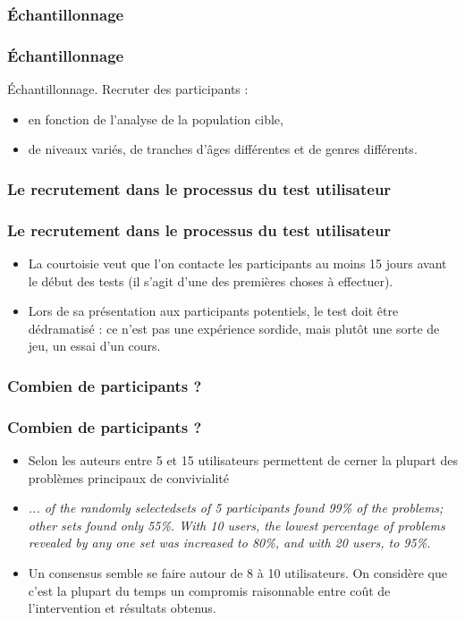 			\subsubsection{Échantillonnage} 
			
			\begin{frame}[allowframebreaks]
			\frametitle{Échantillonnage}
			Échantillonnage. Recruter des participants :
					\begin {itemize}
					\item en fonction de l’analyse de la population cible, 
					\item de niveaux variés, de tranches d’âges différentes et de genres différents.
					\end{itemize}
			\end{frame} 	
			
			\subsubsection{Le recrutement dans le processus du test utilisateur} 
			
			\begin{frame}[allowframebreaks]
			\frametitle{Le recrutement dans le processus du test utilisateur}
			\begin {itemize}
					\item La courtoisie veut que l’on contacte les participants au moins 15 jours avant le début des tests (il s’agit d’une des premières choses à effectuer).
					\item Lors de sa présentation aux participants potentiels, le test doit être dédramatisé : ce n’est pas une expérience sordide, mais plutôt une sorte de jeu, un essai d’un cours.
					\end{itemize}
			\end{frame} 
			
			\subsubsection{Combien de participants ?} 
			\begin{frame}[allowframebreaks]
			\frametitle{Combien de participants ?}
				\begin {itemize}
				\item Selon les auteurs entre 5 et 15 utilisateurs permettent de cerner la plupart des problèmes principaux de convivialité \citep{nielsen1993a}\citep{spool2001a} \citep{cockton2008a} 
				\item \textit{... of the randomly selectedsets of 5 participants found
99\% of the problems; other sets found only 55\%. With 10 users, the lowest percentage of problems revealed
by any one set was increased to 80\%, and with 20 users, to 95\%.}  \citep{cockton2008a}
				\item Un consensus semble se faire autour de 8 à 10 utilisateurs. On considère que c'est la plupart du temps un compromis raisonnable entre coût de l'intervention et résultats obtenus.  \citep{ergolab2014a}
				\end{itemize} 
			\end{frame} 
			
